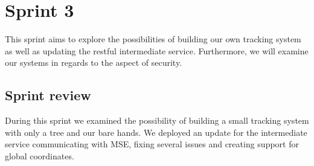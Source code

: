 \chapter{Sprint 3}\label{cha:sprint3}
This sprint aims to explore the possibilities of building our own tracking system as well as updating the restful intermediate service. Furthermore, we will examine our systems in regards to the aspect of security. 




\section{Sprint review}
During this sprint we examined the possibility of building a small tracking system with only a tree and our bare hands. We deployed an update for the intermediate service communicating with MSE, fixing several issues and creating support for global coordinates. 